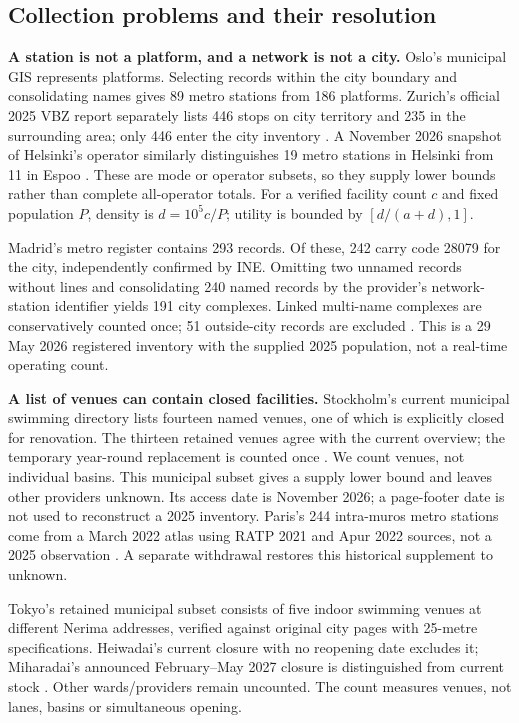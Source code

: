 \subsection{Collection problems and their resolution}
\textbf{A station is not a platform, and a network is not a city.}
Oslo's municipal GIS represents platforms. Selecting records within the city
boundary and consolidating names gives 89 metro stations from 186 platforms.
Zurich's official 2025 VBZ report separately lists 446 stops on city territory
and 235 in the surrounding area; only 446 enter the city inventory
\cite{oslo,vbz}. A November 2026 snapshot of Helsinki's operator similarly
distinguishes 19 metro stations in Helsinki from 11 in Espoo \cite{helsinki}.
These are mode or operator subsets, so they supply
lower bounds rather than complete all-operator totals. For a verified facility
count $c$ and fixed population $P$, density is $d=10^5c/P$; utility is bounded by
$[d/(a+d),1]$.

Madrid's metro register contains 293 records. Of these, 242 carry code 28079 for the city, independently confirmed by INE. Omitting two unnamed records without lines and consolidating 240 named records by the provider's network-station identifier yields 191 city complexes. Linked multi-name complexes are conservatively counted once; 51 outside-city records are excluded \cite{madridmetro,inecodes}. This is a 29 May 2026 registered inventory with the supplied 2025 population, not a real-time operating count.

\textbf{A list of venues can contain closed facilities.}
Stockholm's current municipal swimming directory lists fourteen named venues,
one of which is explicitly closed for renovation. The thirteen retained venues
agree with the current overview; the temporary year-round replacement is
counted once \cite{stockpool}. We count venues, not individual basins. This
municipal subset gives a supply lower bound and leaves other providers unknown.
Its access date is November 2026; a page-footer date is not used to reconstruct
a 2025 inventory. Paris's 244 intra-muros metro stations come from a March 2022
atlas using RATP 2021 and Apur 2022 sources, not a 2025 observation
\cite{apur}. A separate withdrawal restores this historical supplement to unknown.

Tokyo's retained municipal subset consists of five indoor swimming venues at different Nerima addresses, verified against original city pages with 25-metre specifications. Heiwadai's current closure with no reopening date excludes it; Miharadai's announced February--May 2027 closure is distinguished from current stock \cite{nerimapool,nerimaclose}. Other wards/providers remain uncounted. The count measures venues, not lanes, basins or simultaneous opening.

